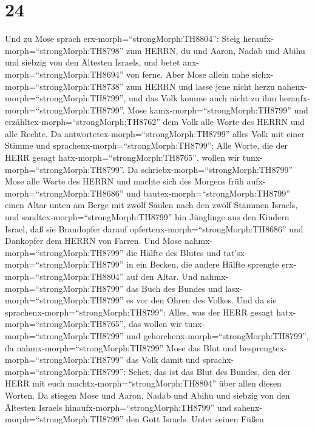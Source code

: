 \hypertarget{section-23}{%
\section{24}\label{section-23}}

 Und zu Mose sprach erx-morph=``strongMorph:TH8804'': Steig
heraufx-morph=``strongMorph:TH8798'' zum HERRN, du und Aaron, Nadab und
Abihu und siebzig von den Ältesten Israels, und betet
anx-morph=``strongMorph:TH8694'' von ferne.  Aber Mose
allein nahe sichx-morph=``strongMorph:TH8738'' zum HERRN und lasse jene
nicht herzu nahenx-morph=``strongMorph:TH8799'', und das Volk komme auch
nicht zu ihm heraufx-morph=``strongMorph:TH8799''.  Mose
kamx-morph=``strongMorph:TH8799'' und
erzähltex-morph=``strongMorph:TH8762'' dem Volk alle Worte des HERRN und
alle Rechte. Da antwortetex-morph=``strongMorph:TH8799'' alles Volk mit
einer Stimme und sprachenx-morph=``strongMorph:TH8799'': Alle Worte, die
der HERR gesagt hatx-morph=``strongMorph:TH8765'', wollen wir
tunx-morph=``strongMorph:TH8799''.  Da
schriebx-morph=``strongMorph:TH8799'' Mose alle Worte des HERRN und
machte sich des Morgens früh aufx-morph=``strongMorph:TH8686'' und
bautex-morph=``strongMorph:TH8799'' einen Altar unten am Berge mit zwölf
Säulen nach den zwölf Stämmen Israels,  und
sandtex-morph=``strongMorph:TH8799'' hin Jünglinge aus den Kindern
Israel, daß sie Brandopfer darauf opfertenx-morph=``strongMorph:TH8686''
und Dankopfer dem HERRN von Farren.  Und Mose
nahmx-morph=``strongMorph:TH8799'' die Hälfte des Blutes und
tat'sx-morph=``strongMorph:TH8799'' in ein Becken, die andere Hälfte
sprengte erx-morph=``strongMorph:TH8804'' auf den Altar. 
Und nahmx-morph=``strongMorph:TH8799'' das Buch des Bundes und
lasx-morph=``strongMorph:TH8799'' es vor den Ohren des Volkes. Und da
sie sprachenx-morph=``strongMorph:TH8799'': Alles, was der HERR gesagt
hatx-morph=``strongMorph:TH8765'', das wollen wir
tunx-morph=``strongMorph:TH8799'' und
gehorchenx-morph=``strongMorph:TH8799'',  da
nahmx-morph=``strongMorph:TH8799'' Mose das Blut und
besprengtex-morph=``strongMorph:TH8799'' das Volk damit und
sprachx-morph=``strongMorph:TH8799'': Sehet, das ist das Blut des
Bundes, den der HERR mit euch machtx-morph=``strongMorph:TH8804'' über
allen diesen Worten.  Da stiegen Mose und Aaron, Nadab und
Abihu und siebzig von den Ältesten Israels
hinaufx-morph=``strongMorph:TH8799''  und
sahenx-morph=``strongMorph:TH8799'' den Gott Israels. Unter seinen Füßen
